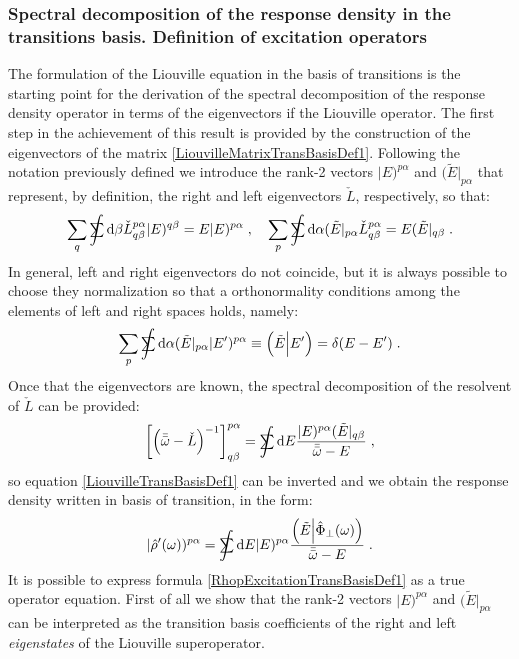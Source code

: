 \documentclass[a4paper]{article}
\newcommand{\dd}{{\rm d}}
\newcommand{\bomega}{\bar\omega}
\newcommand{\bbomega}{\bar{\bomega}}
\newcommand{\sint}{\mathrlap{\displaystyle\int}
\mathrlap{\textstyle\sum}
\phantom{\mathrlap{\displaystyle
\int}\textstyle\sum}}
\newcommand{\be}{\begin{equation}}
\newcommand{\ee}{\end{equation}}
\newcommand{\lb}{\label}
\newcommand{\op}[1]{\hat {#1}}
\newcommand{\optr}[1]{\check #1}
\newcommand{\opskew}[1]{{\op {#1}}_{\perp}}
\newcommand{\sket}[2]{| #2)^{#1}}
\newcommand{\sbra}[2]{( #2|_{#1}}
\newcommand{\dbraket}[2]{\Bigl(#1 \Bigl| #2 \Bigr)}
\newcommand{\dm}{\op{\rho}}
\begin{document}
\subsubsection{Spectral decomposition of the response density in the transitions basis. Definition of excitation operators}

The formulation of the Liouville equation in the basis of transitions is the starting point for the derivation of the spectral decomposition of the response density operator
in terms of the eigenvectors if the Liouville operator. The first step in the achievement of this result is provided by the construction of the eigenvectors of the matrix 
\eqref{LiouvilleMatrixTransBasisDef1}. Following the notation previously defined we introduce the rank-2 vectors $\sket{p\alpha}{E}$ and $\sbra{p\alpha}{\tilde E}$ that represent, 
by definition, the right and left eigenvectors $\optr{L}$, respectively, so that:
\be\lb{LiouvMatrixEigenvectorDef1}
\sum_q \sint \dd \beta \optr{L}^{p \alpha}_{q\beta} \sket{q \beta}{E} = E \sket{p\alpha}{E} \;, \quad
\sum_p \sint \dd \alpha \sbra{p\alpha}{\tilde E} \optr{L}^{p \alpha}_{q\beta} = E \sbra{q\beta}{\tilde E}\;.
\ee
In general, left and right eigenvectors do not coincide, but it is always possible to choose they normalization so that a orthonormality conditions among the
elements of left and right spaces holds, namely:
\be\lb{ExcitationOrthonormalityDef1}
\sum_p \sint \dd \alpha \sbra{p\alpha}{\tilde E}\sket{p\alpha}{E'} \equiv \dbraket{\tilde E}{E'} = \delta(E-E') \;.
\ee
Once that the eigenvectors are known, the spectral decomposition of the resolvent of $\optr{L}$ can be provided:  
\be
\left[\left(\bbomega-\optr{L}\right)^{-1}\right]^{p\alpha}_{q\beta} =\sint\dd E
\frac{\sket{p\alpha}{E}\sbra{q\beta}{\tilde E}}{\bbomega-E} \;,
\ee
so equation \eqref{LiouvilleTransBasisDef1} can be inverted and we obtain the response density written in basis of transition, in the form:
\be\lb{RhopExcitationTransBasisDef1}
\sket{p\alpha}{\dm'(\omega)} = 
\sint\dd E \sket{p\alpha}{E}
\frac{\dbraket{\tilde E}{\opskew{\Phi}(\omega)}}{\bbomega-E} \;.
\ee
It is possible to express formula \eqref{RhopExcitationTransBasisDef1} as a true operator equation. First of all we show that the rank-2 vectors $\sket{p\alpha}{E}$ 
and $\sbra{p\alpha}{\tilde E}$ can be interpreted as the transition basis coefficients of the right and left \emph{eigenstates} of the Liouville superoperator.   
\end{document}
